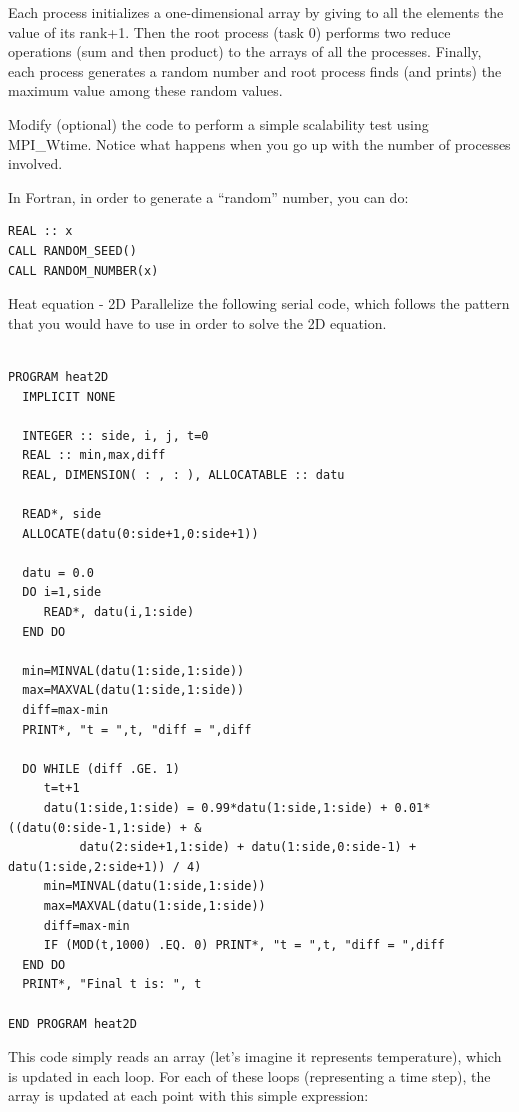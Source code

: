 Each process initializes a one-dimensional array by giving to all the elements
the value of its rank+1. Then the root process (task 0) performs two reduce
operations (sum and then product) to the arrays of all the processes. Finally,
each process generates a random number and root process finds (and prints) the
maximum value among these random values.
 
Modify (optional) the code to perform a simple scalability test using MPI\_Wtime. Notice
what happens when you go up with the number of processes involved.

In Fortran, in order to generate a ``random'' number, you can do:

\begin{verbatim}
REAL :: x
CALL RANDOM_SEED()
CALL RANDOM_NUMBER(x)
\end{verbatim}



 {Heat equation - 2D}
\label{ex:collective-mpi-heat2d}
Parallelize the following serial code, which follows the pattern that you would
have to use in order to solve the 2D equation.

\begin{verbatim}

PROGRAM heat2D
  IMPLICIT NONE

  INTEGER :: side, i, j, t=0
  REAL :: min,max,diff
  REAL, DIMENSION( : , : ), ALLOCATABLE :: datu

  READ*, side
  ALLOCATE(datu(0:side+1,0:side+1))

  datu = 0.0
  DO i=1,side
     READ*, datu(i,1:side)
  END DO

  min=MINVAL(datu(1:side,1:side))
  max=MAXVAL(datu(1:side,1:side))
  diff=max-min
  PRINT*, "t = ",t, "diff = ",diff

  DO WHILE (diff .GE. 1)
     t=t+1
     datu(1:side,1:side) = 0.99*datu(1:side,1:side) + 0.01*((datu(0:side-1,1:side) + &
          datu(2:side+1,1:side) + datu(1:side,0:side-1) + datu(1:side,2:side+1)) / 4)
     min=MINVAL(datu(1:side,1:side))
     max=MAXVAL(datu(1:side,1:side))
     diff=max-min
     IF (MOD(t,1000) .EQ. 0) PRINT*, "t = ",t, "diff = ",diff
  END DO
  PRINT*, "Final t is: ", t

END PROGRAM heat2D
\end{verbatim}

This code simply reads an array (let's imagine it represents temperature), which
is updated in each loop. For each of these loops (representing a time step), the
array is updated at each point with this simple expression:

